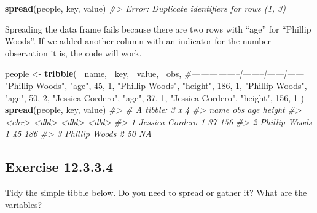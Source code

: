 \documentclass[]{book}
\newenvironment{Shaded}{\begin{snugshade}}{\end{snugshade}}
\newcommand{\CommentTok}[1]{\textcolor[rgb]{0.56,0.35,0.01}{\textit{#1}}}
\newcommand{\DecValTok}[1]{\textcolor[rgb]{0.00,0.00,0.81}{#1}}
\newcommand{\KeywordTok}[1]{\textcolor[rgb]{0.13,0.29,0.53}{\textbf{#1}}}
\newcommand{\NormalTok}[1]{#1}
\newcommand{\OperatorTok}[1]{\textcolor[rgb]{0.81,0.36,0.00}{\textbf{#1}}}
\newcommand{\StringTok}[1]{\textcolor[rgb]{0.31,0.60,0.02}{#1}}
\theoremstyle{plain}
\theoremstyle{remark}
\begin{document}
\begin{Shaded}
\begin{Highlighting}[]
\KeywordTok{spread}\NormalTok{(people, key, value)}
\CommentTok{#> Error: Duplicate identifiers for rows (1, 3)}
\end{Highlighting}
\end{Shaded}

Spreading the data frame fails because there are two rows with ``age'' for ``Phillip Woods''.
If we added another column with an indicator for the number observation it is,
the code will work.

\begin{Shaded}
\begin{Highlighting}[]
\NormalTok{people <-}\StringTok{ }\KeywordTok{tribble}\NormalTok{(}
  \OperatorTok{~}\NormalTok{name,             }\OperatorTok{~}\NormalTok{key,    }\OperatorTok{~}\NormalTok{value, }\OperatorTok{~}\NormalTok{obs,}
  \CommentTok{#-----------------|--------|------|------}
  \StringTok{"Phillip Woods"}\NormalTok{,   }\StringTok{"age"}\NormalTok{,       }\DecValTok{45}\NormalTok{, }\DecValTok{1}\NormalTok{,}
  \StringTok{"Phillip Woods"}\NormalTok{,   }\StringTok{"height"}\NormalTok{,   }\DecValTok{186}\NormalTok{, }\DecValTok{1}\NormalTok{,}
  \StringTok{"Phillip Woods"}\NormalTok{,   }\StringTok{"age"}\NormalTok{,       }\DecValTok{50}\NormalTok{, }\DecValTok{2}\NormalTok{,}
  \StringTok{"Jessica Cordero"}\NormalTok{, }\StringTok{"age"}\NormalTok{,       }\DecValTok{37}\NormalTok{, }\DecValTok{1}\NormalTok{,}
  \StringTok{"Jessica Cordero"}\NormalTok{, }\StringTok{"height"}\NormalTok{,   }\DecValTok{156}\NormalTok{, }\DecValTok{1}
\NormalTok{)}
\KeywordTok{spread}\NormalTok{(people, key, value)}
\CommentTok{#> # A tibble: 3 x 4}
\CommentTok{#>   name              obs   age height}
\CommentTok{#>   <chr>           <dbl> <dbl>  <dbl>}
\CommentTok{#> 1 Jessica Cordero     1    37    156}
\CommentTok{#> 2 Phillip Woods       1    45    186}
\CommentTok{#> 3 Phillip Woods       2    50     NA}
\end{Highlighting}
\end{Shaded}

\hypertarget{exercise-12.3.3.4}{%
\subsection*{\texorpdfstring{Exercise {12.3.3.4}}{Exercise 12.3.3.4}}\label{exercise-12.3.3.4}}

Tidy the simple tibble below. Do you need to spread or gather it? What are the variables?
\end{document}
